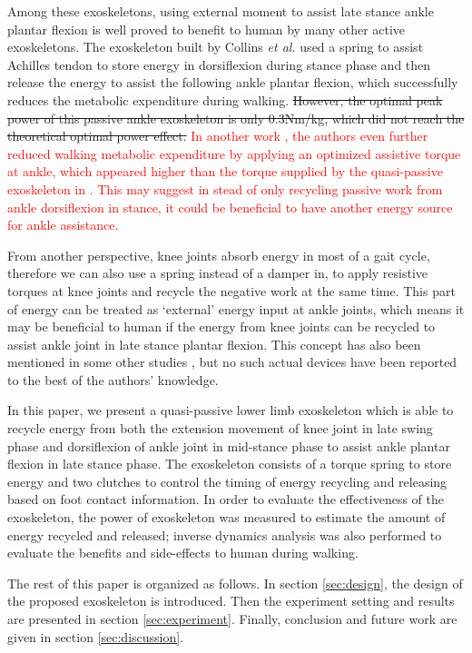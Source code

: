 \documentclass[twocolumn,cleanfoot,10pt]{asme2ej}
\begin{document}
Among these exoskeletons, using external moment to assist late stance ankle plantar flexion is well proved to benefit to human by many other active exoskeletons\cite{RN5,RN9,RN10,RN11,RN12}. The exoskeleton built by Collins \emph{et al.}\cite{RN5} used a spring to assist Achilles tendon to store energy in dorsiflexion during stance phase and then release the energy to assist the following ankle plantar flexion, which successfully reduces the metabolic expenditure during walking. \sout{However, the optimal peak power of this passive ankle exoskeleton \cite{RN5} is only 0.3Nm/kg, which did not reach the theoretical optimal power effect\cite{zhang2017human}.}
\textcolor{red}{In another work \cite{zhang2017human}, the authors even further reduced walking metabolic expenditure by applying an optimized assistive torque at ankle, which appeared higher than the torque supplied by the quasi-passive exoskeleton in \cite{RN5}. This may suggest in stead of only recycling passive work from ankle dorsiflexion in stance, it could be beneficial to have another energy source for ankle assistance.}

From another perspective, knee joints absorb energy in most of a gait cycle\cite{RN2}, therefore we can also use a spring instead of a damper in\cite{RN3}, to apply resistive torques at knee joints and recycle the negative work at the same time. This part of energy can be treated as ‘external’ energy input at ankle joints, which means it may be beneficial to human if the energy from knee joints can be recycled to assist ankle joint in late stance plantar flexion. This concept has also been mentioned in some other studies\cite{RN3} \cite{RN12}, but no such actual devices have been reported to the best of the authors' knowledge.

In this paper, we present a quasi-passive lower limb exoskeleton which is able to recycle energy from both the extension movement of knee joint in late swing phase and dorsiflexion of ankle joint in mid-stance phase to assist ankle plantar flexion in late stance phase. The exoskeleton consists of a torque spring to store energy and two clutches to control the timing of energy recycling and releasing based on foot contact information. In order to evaluate the effectiveness of the exoskeleton, the power of exoskeleton was measured to estimate the amount of energy recycled and released; inverse dynamics analysis was also performed to evaluate the benefits and side-effects to human during walking.

The rest of this paper is organized as follows. In section \ref{sec:design}, the design of the proposed exoskeleton is introduced. Then the experiment setting and results are presented in section \ref{sec:experiment}. Finally, conclusion and future work are given in section \ref{sec:discussion}.
\end{document}
